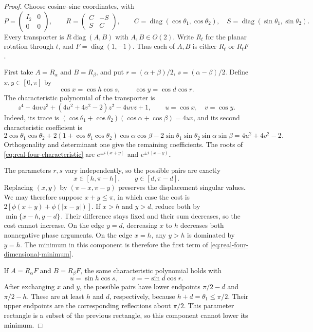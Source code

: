 \begin{proof}
Choose cosine--sine coordinates, with
\[
 P=\begin{pmatrix}I_2&0\\0&0\end{pmatrix},\qquad
 R=\begin{pmatrix}C&-S\\S&C\end{pmatrix},\qquad
 C=\operatorname{diag}(\cos\theta_1,\cos\theta_2),\quad
 S=\operatorname{diag}(\sin\theta_1,\sin\theta_2).
\]
Every transporter is $R\operatorname{diag}(A,B)$ with $A,B\in O(2)$.
Write $R_t$ for the planar rotation through $t$, and
$F=\operatorname{diag}(1,-1)$. Thus each of $A,B$ is either $R_t$
or $R_tF$.

First take $A=R_\alpha$ and $B=R_\beta$, and put
$r=(\alpha+\beta)/2$, $s=(\alpha-\beta)/2$. Define $x,y\in[0,\pi]$
by
\[
 \cos x=\cos h\cos s,\qquad \cos y=\cos d\cos r.
\]
The characteristic polynomial of the transporter is
\begin{equation}
 z^4-4uvz^3+(4u^2+4v^2-2)z^2-4uvz+1,
 \qquad u=\cos x,\quad v=\cos y.
 \label{eq:real-four-characteristic}
\end{equation}
Indeed, its trace is $(\cos\theta_1+\cos\theta_2)
(\cos\alpha+\cos\beta)=4uv$, and its second characteristic
coefficient is
\[
 2\cos\theta_1\cos\theta_2
 +2(1+\cos\theta_1\cos\theta_2)\cos\alpha\cos\beta
 -2\sin\theta_1\sin\theta_2\sin\alpha\sin\beta
 =4u^2+4v^2-2.
\]
Orthogonality and determinant one give the remaining coefficients.
The roots of \cref{eq:real-four-characteristic} are
$e^{\pm i(x+y)}$ and $e^{\pm i(x-y)}$.

The parameters $r,s$ vary independently, so the possible pairs are exactly
\[
 x\in[h,\pi-h],\qquad y\in[d,\pi-d].
\]
Replacing $(x,y)$ by $(\pi-x,\pi-y)$ preserves the displacement
singular values. We may therefore suppose $x+y\leq\pi$, in which case
the cost is $2[\phi(x+y)+\phi(|x-y|)]$.
If $x>h$ and $y>d$, reduce both by
$\min\{x-h,y-d\}$. Their difference stays fixed and their sum decreases,
so the cost cannot increase. On the edge $y=d$, decreasing $x$ to $h$
decreases both nonnegative phase arguments. On the edge $x=h$, any
$y>h$ is dominated by $y=h$. The minimum in this component is therefore
the first term of \cref{eq:real-four-dimensional-minimum}.

If $A=R_\alpha F$ and $B=R_\beta F$, the same characteristic polynomial
holds with
\[
 u=\sin h\cos s,\qquad v=-\sin d\cos r.
\]
After exchanging $x$ and $y$, the possible pairs have lower endpoints
$\pi/2-d$ and $\pi/2-h$. These are at least $h$ and $d$, respectively,
because $h+d=\theta_1\leq\pi/2$. Their upper endpoints are the
corresponding reflections about $\pi/2$. This parameter rectangle is a
subset of the previous rectangle, so this component cannot lower its
minimum.


\end{proof}
